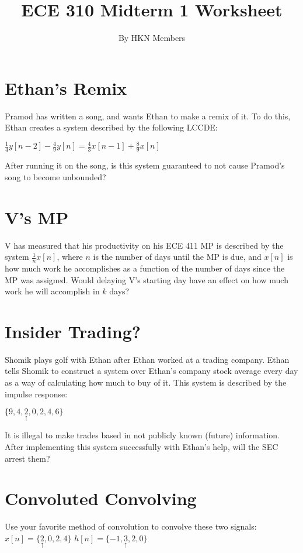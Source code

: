 \documentclass{article}
\title{ECE 310 Midterm 1 Worksheet}
\author{By HKN Members}
\date{}
\begin{document}
\maketitle

\section{Ethan's Remix}
Pramod has written a song, and wants Ethan to make a remix of it. To do this, Ethan creates a system described by the following LCCDE:

$ \frac{1}{4} y[n-2] - \frac{4}{9} y[n] = \frac{4}{3} x[n-1] + \frac{8}{9} x[n]$

After running it on the song, is this system guaranteed to not cause Pramod's song to become unbounded?

\section{V's MP}
V has measured that his productivity on his ECE 411 MP is described by the system $\frac{1}{n} x[n]$, where $n$ is the number of days until the MP is due, and $x[n]$ is how much work he accomplishes as a function of the number of days since the MP was assigned. Would delaying V's starting day have an effect on how much work he will accomplish in $k$ days?

\section{Insider Trading?}

Shomik plays golf with Ethan after Ethan worked at a trading company. Ethan tells Shomik to construct a system over Ethan's company stock average every day as a way of calculating how much to buy of it. This system is described by the impulse response:

$\{9,4,\underset{\uparrow}{2},0,2,4,6\}$


It is illegal to make trades based in not publicly known (future) information. After implementing this system successfully with Ethan's help, will the SEC arrest them?

\section{Convoluted Convolving}
Use your favorite method of convolution to convolve these two signals:
\newline
\indent \indent \indent \indent 
$x[n]=\{\underset{\uparrow}{2},0,2,4\}$ \indent \indent $h[n]=\{-1,\underset{\uparrow}{3},2,0\}$
\end{document}
